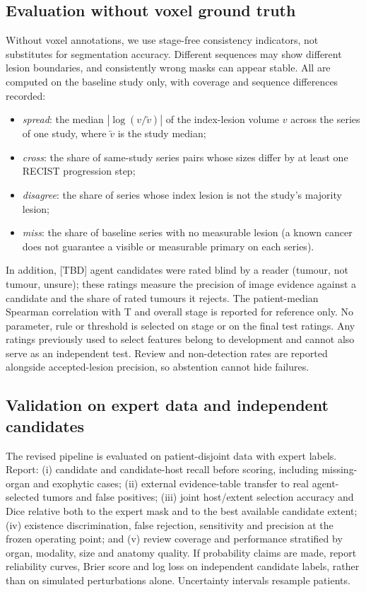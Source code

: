 \documentclass[fleqn,10pt]{olplainarticle}
\begin{document}
\subsection{Evaluation without voxel ground truth}
\label{sec:eval_protocol}
Without voxel annotations, we use stage-free consistency indicators, not substitutes for segmentation accuracy. Different
sequences may show different lesion boundaries, and consistently wrong masks can appear stable. All are computed on
the baseline study only, with coverage and sequence differences recorded:
\begin{itemize}
  \item \emph{spread}: the median $|\log(v/\tilde v)|$ of the index-lesion volume $v$ across the series of one study,
  where $\tilde v$ is the study median;
  \item \emph{cross}: the share of same-study series pairs whose sizes differ by at least one RECIST progression step;
  \item \emph{disagree}: the share of series whose index lesion is not the study's majority lesion;
  \item \emph{miss}: the share of baseline series with no measurable lesion (a known cancer does not guarantee a visible or measurable primary on each series).
\end{itemize}
In addition, [TBD] agent candidates were rated blind by a reader (tumour, not tumour, unsure); these ratings measure the
precision of image evidence against a candidate and the share of rated tumours it rejects. The patient-median Spearman
correlation with T and overall stage is reported for reference only. No parameter, rule or threshold is selected on stage
or on the final test ratings. Any ratings previously used to select features belong to development and cannot also serve
as an independent test. Review and non-detection rates are reported alongside accepted-lesion precision, so abstention
cannot hide failures.

\subsection{Validation on expert data and independent candidates}
\label{sec:results_expert}
The revised pipeline is evaluated on patient-disjoint data with expert labels. Report: (i) candidate and candidate-host
recall before scoring, including missing-organ and exophytic cases; (ii) external evidence-table transfer to real
agent-selected tumors and false positives; (iii) joint host/extent selection accuracy and Dice relative both to the expert
mask and to the best available candidate extent; (iv) existence discrimination, false rejection, sensitivity and precision
at the frozen operating point; and (v) review coverage and performance stratified by organ, modality, size and anatomy
quality. If probability claims are made, report reliability curves, Brier score and log loss on independent candidate
labels, rather than on simulated perturbations alone. Uncertainty intervals resample patients.
\end{document}
